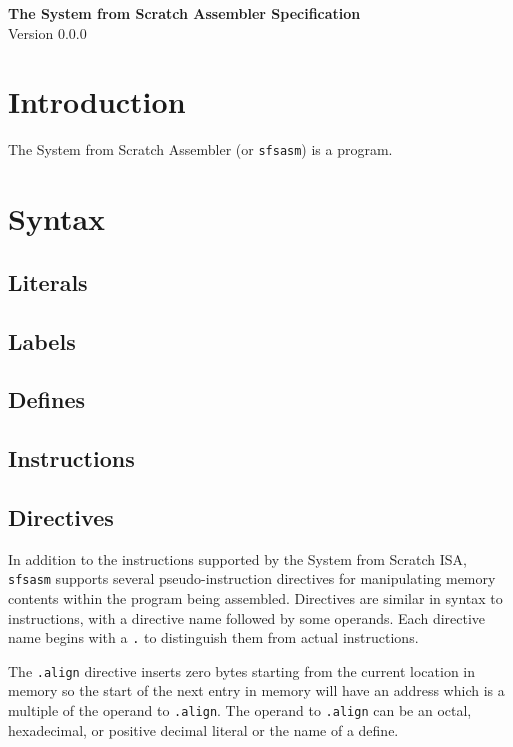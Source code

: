 \documentclass{article}
\begin{document}
\vspace*{\fill}
\begin{flushright}
{\Huge\bf The System from Scratch Assembler Specification}\\
\vspace{2em}
{\Large Version 0.0.0}
\end{flushright}
\vspace*{\fill}
\pagebreak{}

\tableofcontents
\pagebreak{}

\section{Introduction}
The System from Scratch Assembler (or {\tt sfsasm}) is a program.

\section{Syntax}
\subsection{Literals}

\subsection{Labels}

\subsection{Defines}

\subsection{Instructions}

\subsection{Directives}
In addition to the instructions supported by the System from Scratch ISA, {\tt sfsasm} supports several pseudo-instruction directives for manipulating memory contents within the program being assembled. Directives are similar in syntax to instructions, with a directive name followed by some operands. Each directive name begins with a {\tt .} to distinguish them from actual instructions.

The {\tt .align} directive inserts zero bytes starting from the current location in memory so the start of the next entry in memory will have an address which is a multiple of the operand to {\tt .align}. The operand to {\tt .align} can be an octal, hexadecimal, or positive decimal literal or the name of a define.
\end{document}
